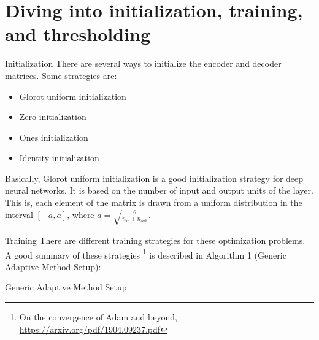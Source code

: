 \documentclass{beamer}
\begin{document}
\section{Diving into initialization, training, and thresholding}

\begin{frame}{Initialization}
    There are several ways to initialize the encoder and decoder matrices. Some strategies are:
    \begin{itemize}
        \item Glorot uniform initialization
        \item Zero initialization
        \item Ones initialization
        \item Identity initialization
    \end{itemize}

    \pause

    Basically, Glorot uniform initialization is a good initialization strategy for deep neural networks.
    It is based on the number of input and output units of the layer.
    This is, each element of the matrix is drawn from a uniform distribution in the interval \([-a, a]\), where \(a = \sqrt{\frac{6}{n_{\mathrm{in}} + n_{\mathrm{out}}}}\).

\end{frame}

\begin{frame}{Training}
    There are different training strategies for these optimization problems.
    A good summary of these strategies \footnote{On the convergence of Adam and beyond, \url{https://arxiv.org/pdf/1904.09237.pdf}} is described in Algorithm 1 (Generic Adaptive Method Setup):
\begin{algorithm}[H]
\caption{Generic Adaptive Method Setup}
\DontPrintSemicolon
{}
\end{algorithm}
\end{frame}
\end{document}
